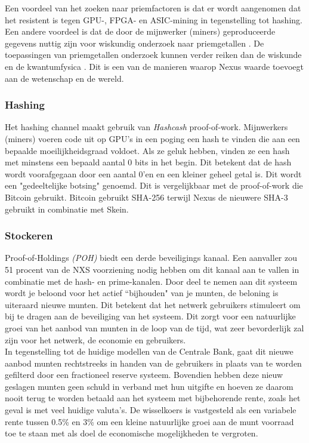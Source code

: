 \documentclass[11pt]{article}
\begin{document}
\noindent Een voordeel van het zoeken naar priemfactoren is dat er wordt aangenomen dat het resistent is tegen GPU-, FPGA- en ASIC-mining in tegenstelling tot hashing. Een andere voordeel is dat de door de mijnwerker (miners) geproduceerde gegevens nuttig zijn voor wiskundig onderzoek naar priemgetallen \cite{findingprimeclusterspaper} \cite{nxsprimecom}.
De toepassingen van priemgetallen onderzoek kunnen verder reiken dan de wiskunde en de kwantumfysica \cite{physicsmathprime}.
Dit is een van de manieren waarop Nexus waarde toevoegt aan de wetenschap en de wereld.

\subsubsection{Hashing}

Het hashing channel maakt gebruik van \textit{Hashcash} \cite{hashcash} proof-of-work.
Mijnwerkers (miners) voeren code uit \cite{skminer,wolfniro} op GPU's in een poging een hash te vinden die aan een bepaalde moeilijkheidsgraad voldoet. Als ze geluk hebben, vinden ze een hash met minstens een bepaald aantal 0 bits in het begin. Dit betekent dat de hash wordt voorafgegaan door een aantal 0'en en een kleiner geheel getal is. Dit wordt een "gedeeltelijke botsing" genoemd. Dit is vergelijkbaar met de proof-of-work die Bitcoin gebruikt. Bitcoin gebruikt SHA-256 terwijl Nexus de nieuwere SHA-3 gebruikt in combinatie met Skein.


\subsubsection{Stockeren}

Proof-of-Holdings \textit{(POH)} biedt een derde beveiligings kanaal. Een aanvaller zou 51 procent van de NXS voorziening nodig hebben om dit kanaal aan te vallen in combinatie met de hash- en prime-kanalen. Door deel te nemen aan dit systeem wordt je beloond voor het actief ``bijhouden" van je munten, de beloning is uiteraard nieuwe munten. Dit betekent dat het netwerk gebruikers stimuleert om bij te dragen aan de beveiliging van het systeem. Dit zorgt voor een natuurlijke groei van het aanbod van munten in de loop van de tijd, wat zeer bevorderlijk zal zijn voor het netwerk, de economie en gebruikers.\\ 

\noindent In tegenstelling tot de huidige modellen van de Centrale Bank, gaat dit nieuwe aanbod munten rechtstreeks in handen van de gebruikers in plaats van te worden gefilterd door een fractioneel reserve systeem. Bovendien hebben deze nieuw geslagen munten geen schuld in verband met hun uitgifte en hoeven ze daarom nooit terug te worden betaald aan het systeem met bijbehorende rente, zoals het geval is met veel huidige valuta's. De wisselkoers is vastgesteld als een variabele rente tussen 0.5\% en 3\% om een ​​kleine natuurlijke groei aan de munt voorraad toe te staan met als doel de economische mogelijkheden te vergroten.
\end{document}
